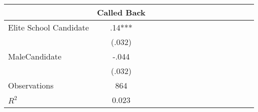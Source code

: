 \begin{tabular}{l*{14}{c}}
                    &\multicolumn{1}{c}{Called Back}\\
\hline
Elite School Candidate&         .14***\\
                    &      (.032)   \\
MaleCandidate       &       -.044   \\
                    &      (.032)   \\
\hline
Observations        &         864   \\
\(R^{2}\)           &       0.023   \\
\end{tabular}
